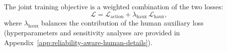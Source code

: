 \documentclass{llmxive}
\begin{document}
The joint training objective is a weighted combination of the two losses:
\begin{equation}
\mathcal{L} = \mathcal{L}_{\mathrm{action}} + \lambda_{\mathrm{haux}}\, \mathcal{L}_{\mathrm{haux}},
\end{equation}
where $\lambda_{\mathrm{haux}}$ balances the contribution of the human auxiliary loss (hyperparameters and sensitivity analyses are provided in Appendix~\ref{app:reliability-aware-human-details}).


\end{document}
